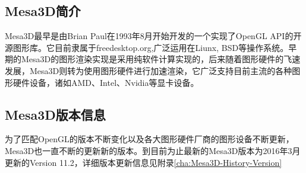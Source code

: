 
\subsection{Mesa3D简介}
Mesa3D最早是由Brian Paul在1993年8月开始开发的一个实现了OpenGL API的开源图形库。它目前隶属于freedesktop.org,广泛运用在Liunx, BSD等操作系统。早期的Mesa3D的图形渲染实现是采用纯软件计算实现的，后来随着图形硬件的飞速发展，Mesa3D则转为使用图形硬件进行加速渲染，它广泛支持目前主流的各种图形硬件设备，诸如AMD、Intel、Nvidia等显卡设备。
\subsection{Mesa3D版本信息}
为了匹配OpenGL的版本不断变化以及各大图形硬件厂商的图形设备不断更新，Mesa3D也一直不断的更新新的版本。到目前为止最新的Mesa3D版本为2016年3月更新的Version 11.2，详细版本更新信息见附录\ref{cha:Mesa3D-History-Version}
